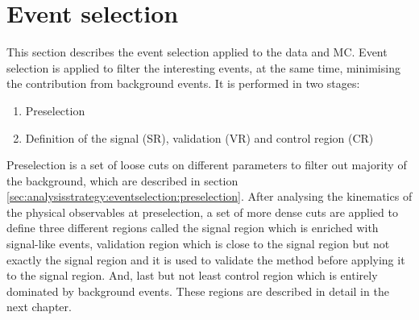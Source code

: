 \section{Event selection}%
\label{sec:analysisstrategy:eventselection}
This section describes the event selection applied to the data and MC. Event selection is applied to filter the interesting events, at the same time, minimising the contribution from background events. It is performed in two stages:
\begin{enumerate}
	\item Preselection
	\item Definition of the signal (SR), validation (VR) and control region (CR)
\end{enumerate}

Preselection is a set of loose cuts on different parameters to filter out majority of the background, which are described in section \ref{sec:analysisstrategy:eventselection:preselection}. After analysing the kinematics of the physical observables at preselection, a set of more dense cuts are applied to define three different regions called the signal region which is enriched with signal-like events, validation region which is close to the signal region but not exactly the signal region and it is used to validate the method before applying it to the signal region. And, last but not least control region which is entirely dominated by background events. These regions are described in detail in the next chapter.

